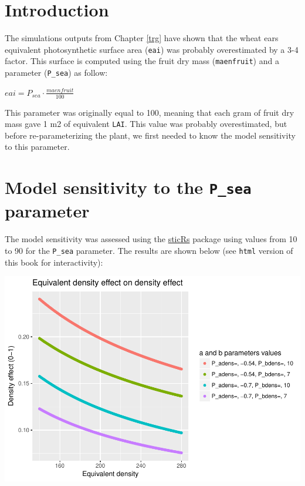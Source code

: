 \documentclass[]{book}
\begin{document}
\hypertarget{introduction-1}{%
\section{Introduction}\label{introduction-1}}

The simulations outputs from Chapter \ref{trg} have shown that the wheat ears equivalent photosynthetic surface area (\texttt{eai}) was probably overestimated by a 3-4 factor. This surface is computed using the fruit dry mass (\texttt{maenfruit}) and a parameter (\texttt{P\_sea}) as follow:

\(eai=P_{sea}\cdot\frac{maenfruit}{100}\)

This parameter was originally equal to 100, meaning that each gram of fruit dry mass gave 1 m2 of equivalent \texttt{LAI}. This value was probably overestimated, but before re-parameterizing the plant, we first needed to know the model sensitivity to this parameter.

\hypertarget{model-sensitivity-to-the-p_sea-parameter}{%
\section{\texorpdfstring{Model sensitivity to the \texttt{P\_sea} parameter}{Model sensitivity to the P\_sea parameter}}\label{model-sensitivity-to-the-p_sea-parameter}}

The model sensitivity was assessed using the \href{https://github.com/VEZY/sticRs}{sticRs} package using values from 10 to 90 for the \texttt{P\_sea} parameter. The results are shown below (see \texttt{html} version of this book for interactivity):

\includegraphics{Postdoc_steps_files/figure-latex/unnamed-chunk-12-1.pdf}
\end{document}
